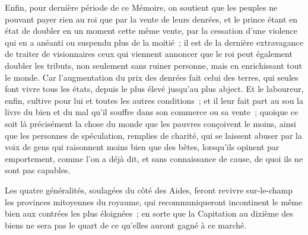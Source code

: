 \documentclass[french,twoside]{book} %
\begin{document}
Enfin, pour dernière période de ce Mémoire, on soutient que les peuples ne pouvant payer rien au roi que par la vente de leurs denrées, et le prince étant en état de doubler en un moment cette même vente, par la cessation d’une violence qui en a anéanti ou suspendu plus de la moitié ; il est de la dernière extravagance de traiter de visionnaires ceux qui viennent annoncer que le roi peut également doubler les tributs, non seulement sans ruiner personne, mais en enrichissant tout le monde. Car l’augmentation du prix des denrées fait celui des terres, qui seules font vivre tous les états, depuis le plus élevé jusqu’au plus abject. Et le laboureur, enfin, cultive pour lui et toutes les autres conditions ; et il leur fait part au sou la livre du bien et du mal qu’il souffre dans son commerce ou sa vente ; quoique ce soit là précisément la chose du monde que les pauvres conçoivent le moins, ainsi que les personnes de spéculation, remplies de charité, qui se laissent abuser par la voix de gens qui raisonnent moins bien que des bêtes, lorsqu’ils opinent par emportement, comme l’on a déjà dit, et sans connaissance de cause, de quoi ils ne sont pas capables.\par
Les quatre généralités, soulagées du côté des Aides, feront revivre sur-le-champ les provinces mitoyennes du royaume, qui recommuniqueront incontinent le même bien aux contrées les plus éloignées ; en sorte que la Capitation au dixième des biens ne sera pas le quart de ce qu’elles auront gagné à ce marché.
\end{document}
